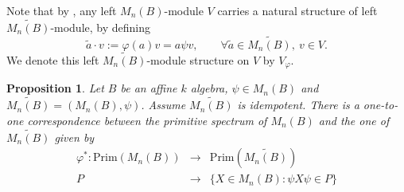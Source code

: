 \documentclass[oneside, a4paper, 11pt]{amsart}
\newtheorem{proposition}[theorem]{Proposition}
\newcommand{\Prim}{\mathrm{Prim}}
\begin{document}
Note that by \cite[Proposition 3.8]{KXaffine},
any left $M_n(B)$-module $V$ carries a natural structure of left
$\widetilde{M_n(B)}$-module, by defining 
$$ \tilde{a}\cdot v :=  \varphi(a)v = a\psi v, \qquad \forall \tilde{a}\in \widetilde{M_n(B)}, \: v\in V.$$
We denote this left $\widetilde{M_n(B)}$-module structure on $V$ by $V_\varphi$.

\newcommand{\tR}{?}


\begin{proposition} \label{primitives} Let $B$ be an affine $k$ algebra, $\psi\in M_n(B)$ and $\widetilde{M_n(B)}=(M_n(B), \psi)$. Assume $\widetilde{M_n(B)}$ is idempotent. There is a one-to-one correspondence between the primitive spectrum of $M_n(B)$ and the one of $\widetilde{M_n(B)}$ given by
$$\begin{array}{ccc}
\varphi^* : \Prim(M_n(B)) & \longrightarrow & \Prim(\widetilde{M_n(B)})\\[0.3cm]
P & \to & \{X\in M_n(B) : \psi X \psi \in P\}
\end{array}$$
\end{proposition}
\end{document}
